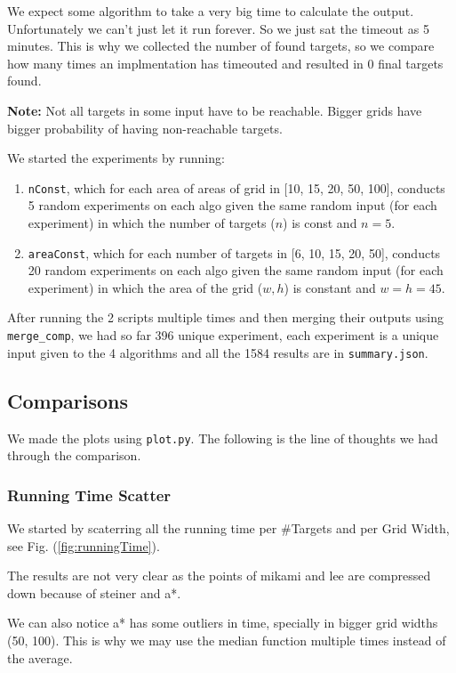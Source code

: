 We expect some algorithm to take a very big time to calculate the output. Unfortunately we can't just let it run forever. So we just sat the timeout as 5 minutes. This is why we collected the number of found targets, so we compare how many times an implmentation has timeouted and resulted in 0 final targets found.

\textbf{Note:} Not all targets in some input have to be reachable. Bigger grids have bigger probability of having non-reachable targets.

We started the experiments by running:
\begin{enumerate}
    \item \texttt{nConst}, which for each area of areas of grid in [10, 15, 20, 50, 100], conducts 5 random experiments on each algo given the same random input (for each experiment) in which the number of targets ($n$) is const and $n = 5$.
    \item \texttt{areaConst}, which for each number of targets in [6, 10, 15, 20, 50], conducts 20 random experiments on each algo given the same random input (for each experiment) in which the area of the grid ($w,h$) is constant and $w = h = 45$.
\end{enumerate}

After running the 2 scripts multiple times and then merging their outputs using \texttt{merge\_comp}, we had so far 396 unique experiment, each experiment is a unique input given to the 4 algorithms and all the 1584 results are in \texttt{summary.json}.

\subsection{Comparisons}
We made the plots using \texttt{plot.py}. The following is the line of thoughts we had through the comparison.

\subsubsection{Running Time Scatter}
We started by scaterring all the running time per \#Targets and per Grid Width, see Fig. (\ref{fig:runningTime}). 

The results are not very clear as the points of mikami and lee are compressed down because of steiner and a*. 

We can also notice a* has some outliers in time, specially in bigger grid widths (50, 100). This is why we may use the median function multiple times instead of the average.

